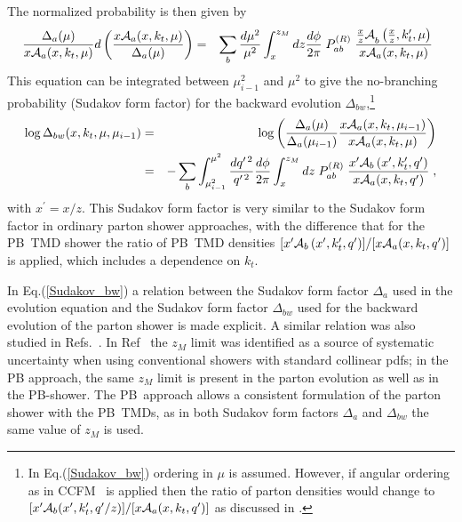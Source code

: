 \documentclass[11pt]{article} \usepackage{mystyle-new}
\newcommand{\cA}{{\cal A}}
\def\PB{{PB}}
\newcommand{\ccfm}{Ciafaloni:1987ur,Catani:1989yc,Catani:1989sg,Marchesini:1994wr}
\begin{document}
The normalized probability is then given by 
\begin{eqnarray}
\label{normProb}
\frac{ \Delta_a ( \mu  )}{ { x{\cal A}}_a(x,k_t, \mu) } d\left( \frac{ { x{\cal A}}_a(x,k_t, \mu) }{ \Delta_a (  \mu  )} \right) &=& 
 \sum_b {{d \mu^2 } \over {\mu^2} } 
\int_x^{z_M} {dz} {{d \phi  } \over {2 \pi  }} \;
P_{ab}^{(R)}  
\; \frac{{\frac{x}{z} {\cal A}}_b\left({\frac{x}{z}}, k_t^{\prime } , 
\mu \right) }{{ x{\cal A}}_a(x,k_t, \mu)}
  \;\;      
\end{eqnarray}
This equation can be integrated between $\mu^2_{i-1}$ and $\mu^2$ to give the no-branching probability (Sudakov form factor) for the backward evolution $\Delta_{bw}$,\footnote{In  Eq.(\ref{Sudakov_bw}) ordering in $\mu$ is assumed. However, if  angular ordering   as in CCFM~\cite{\ccfm}   is applied  then the ratio of parton densities would change to $ [x^{\prime}\cA_b(x^{\prime},k_t^{\prime },q^{\prime}/z)] / [ x\cA_a(x,k_t,q^{\prime})]$ as discussed in \cite{Jung:2010si}.}
\begin{eqnarray}
\label{Sudakov_bw}
\log \Delta_{bw}(x,k_t,\mu,\mu_{i-1}) &=&
\log \left( 
\frac{ \Delta_a (  \mu)}{ \Delta_a (  \mu_{i-1}  )}   
\frac{  x{\cal A}_a(x,k_t, \mu_{i-1}) } { { { x{\cal A}}_a(x,k_t, \mu) }
} \right)  
\\ \nonumber
&= & 
- \sum_b \int_{\mu_{i-1}^2}^{\mu^2}  {{d q^{\prime\,2 } } \over {q^{\prime\,2}} } {{d \phi  } \over {2 \pi  }}
\int_x^{z_M} {dz} \;
P_{ab}^{(R)} \; \frac{{x^\prime {\cal A}}_b\left(x^\prime, k_t^{\prime } , 
q^{\prime }\right) }{{ x{\cal A}}_a(x, k_t, q^{\prime })}
  \;,     
\end{eqnarray}
with $x^\prime=x/z$.
This Sudakov form factor is very similar to the Sudakov form factor in ordinary parton shower approaches, with the difference that for the \PB\ TMD shower the 
ratio of  \PB\ TMD densities  $ [x^\prime {\cal A}_b\left(x^\prime, k_t^{\prime } ,q^{\prime }\right) ]/ [ x{\cal A}_a(x, k_t, q^{\prime }) ]$ is applied, which includes a dependence on $k_t$.


In Eq.(\ref{Sudakov_bw}) a relation between the Sudakov form factor  $\Delta_a$ used in the evolution equation and the Sudakov form factor $\Delta_{bw}$ used for the backward evolution of the parton shower is made explicit. A similar relation was also studied in Refs.~\cite{Nagy:2020gjv,prestel:2020}. 
In Ref~\cite{Nagy:2020gjv} the $z_M$ limit was identified as a source of systematic uncertainty when using conventional showers with standard collinear pdfs; in the PB approach, the same $z_M$ limit is present in the parton evolution as well as in the PB-shower.
The \PB\ approach allows a consistent formulation of the parton shower with the \PB\ TMDs, as in both Sudakov form factors  $\Delta_a$ and $\Delta_{bw}$ the same value of $z_M$ is used.
\end{document}
